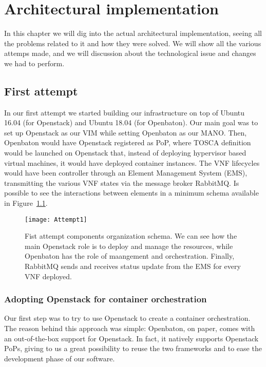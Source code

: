 \chapter{Architectural implementation}
\label{chap:archimpl}
 
In this chapter we will dig into the actual architectural implementation, seeing
all the problems related to it and how they were solved. We will show all the
various attemps made, and we will discussion about the technological issue and
changes we had to perform.

\section{First attempt}

In our first attempt we started building our infrastructure on top of Ubuntu
16.04 (for Openstack) and Ubuntu 18.04 (for Openbaton). Our main goal was to set
up Openstack as our VIM while setting Openbaton as our MANO. Then, Openbaton
would have Openstack registered as PoP, where TOSCA definition would be launched
on Openstack that, instead of deploying hypervisor based virtual machines, it
would have deployed container instances. The VNF lifecycles would have been
controller through an Element Management System (EMS), transmitting the various
VNF states via the message broker RabbitMQ. Is possible to see the interactions
between elements in a minimum schema available in
Figure~\ref{chap:archimpl:sec:fistattempt:img:schema1}.

\begin{figure}[t]
  \centering
  \texttt{[image: Attempt1]}
  \caption[Fist attempt components organization schema]{Fist attempt components
    organization schema. We can see how the main Openstack role is to deploy and
    manage the resources, while Openbaton has the role of maangement and
    orchestration. Finally, RabbitMQ sends and receives status update from the
    EMS for every VNF deployed.}
  \label{chap:archimpl:sec:fistattempt:img:schema1}
\end{figure}

\subsection{Adopting Openstack for container orchestration}

Our first step was to try to use Openstack to create a container orchestration. 
The reason behind this approach was simple: Openbaton, on paper, comes with an 
out-of-the-box support for Openstack. In fact, it natively supports Openstack 
PoPs, giving to us a great possibility to reuse the two frameworks and to ease 
the development phase of our software.
